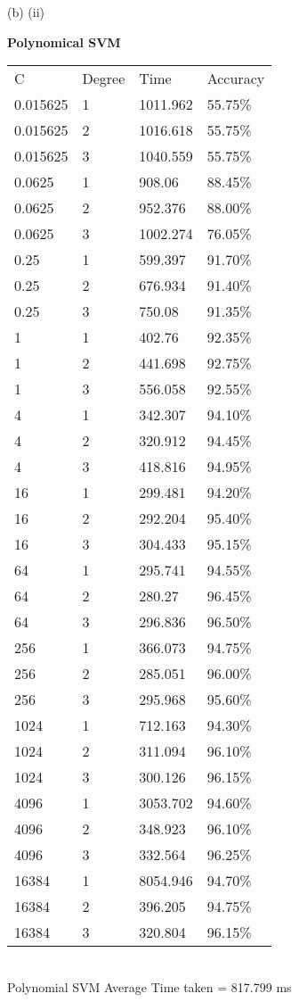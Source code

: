 \documentclass[12pt]{article}
\newenvironment{problem}[2][Problem]{\begin{trivlist}
\item[\hskip \labelsep {\bfseries #1}\hskip \labelsep {\bfseries #2.}]}{\end{trivlist}}
\begin{document}
\begin{problem} 6 (b) (ii)
\end{problem}
\begin{Answer}
\textbf{Polynomical SVM}\\ 
\begin{tabular}{llll}
C        & Degree & Time     & Accuracy \\
0.015625 & 1      & 1011.962 & 55.75\%  \\
0.015625 & 2      & 1016.618 & 55.75\%  \\
0.015625 & 3      & 1040.559 & 55.75\%  \\
0.0625   & 1      & 908.06   & 88.45\%  \\
0.0625   & 2      & 952.376  & 88.00\%  \\
0.0625   & 3      & 1002.274 & 76.05\%  \\
0.25     & 1      & 599.397  & 91.70\%  \\
0.25     & 2      & 676.934  & 91.40\%  \\
0.25     & 3      & 750.08   & 91.35\%  \\
1        & 1      & 402.76   & 92.35\%  \\
1        & 2      & 441.698  & 92.75\%  \\
1        & 3      & 556.058  & 92.55\%  \\
4        & 1      & 342.307  & 94.10\%  \\
4        & 2      & 320.912  & 94.45\%  \\
4        & 3      & 418.816  & 94.95\%  \\
16       & 1      & 299.481  & 94.20\%  \\
16       & 2      & 292.204  & 95.40\%  \\
16       & 3      & 304.433  & 95.15\%  \\
64       & 1      & 295.741  & 94.55\%  \\
64       & 2      & 280.27   & 96.45\%  \\
64       & 3      & 296.836  & 96.50\%  \\
256      & 1      & 366.073  & 94.75\%  \\
256      & 2      & 285.051  & 96.00\%  \\
256      & 3      & 295.968  & 95.60\%  \\
1024     & 1      & 712.163  & 94.30\%  \\
1024     & 2      & 311.094  & 96.10\%  \\
1024     & 3      & 300.126  & 96.15\%  \\
4096     & 1      & 3053.702 & 94.60\%  \\
4096     & 2      & 348.923  & 96.10\%  \\
4096     & 3      & 332.564  & 96.25\%  \\
16384    & 1      & 8054.946 & 94.70\%  \\
16384    & 2      & 396.205  & 94.75\%  \\
16384    & 3      & 320.804  & 96.15\% 
\end{tabular}\\
Polynomial SVM Average Time taken = 817.799 ms\\
\end{Answer}
\end{document}
